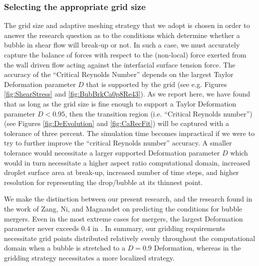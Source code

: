 \documentclass[review]{elsarticle}
\begin{document}
\subsubsection{Selecting the appropriate grid size}

The grid size and adaptive meshing strategy that we adopt is chosen in order to
answer the research question as to the conditions which determine whether a
bubble in shear flow will break-up or not.  In such a case, we must accurately
capture the balance of forces with respect to the (non-local) force exerted
from the wall driven flow acting against the interfacial surface tension force.
The accuracy of the ``Critical Reynolds Number'' depends on the largest Taylor
Deformation parameter $D$ that is supported by the grid (see e.g. Figures
\ref{fig:ShearStress} and \ref{fig:BubBrkCa0p8Re43}).  As we report here, we
have found that as long as the grid size is fine enough to support a Taylor
Deformation parameter $D<0.95$, then the transition region (i.e. ``Critical
Reynolds number'') (see Figures \ref{fig:DeEvolution} and \ref{fig:CaRecFit})
will be captured with a tolerance of three percent.  The simulation time
becomes impractical if we were to try to further improve the ``critical
Reynolds number'' accuracy.  A smaller tolerance would necessitate a larger
supported Deformation parameter $D$ which would in turn necessitate a higher
aspect ratio computational domain, increased droplet surface area at break-up,
increased number of time steps, and higher resolution for representing the
drop/bubble at its thinnest point.

We make the distinction between our present research, and the research found in
the work of Zang, Ni, and Magnaudet\cite{zhang2021three,zhang2022three} on
predicting the conditions for bubble mergers.  Even in the most extreme cases
for mergers, the largest Deformation parameter never exceeds $0.4$ in
\cite{zhang2021three}.  In summary, our gridding requirements necessitate grid
points distributed relatively evenly throughout the computational domain when a
bubble is stretched to a $D=0.9$ Deformation, whereas in \cite{zhang2021three}
the gridding strategy necessitates a more localized strategy.
\end{document}
